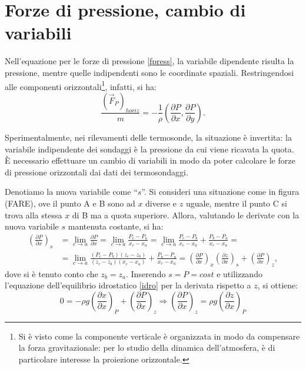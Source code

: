 \section{Forze di pressione, cambio di variabili}
Nell'equazione per le forze di pressione \eqref{fpress}, la variabile dipendente risulta la pressione, mentre quelle indipendenti sono le coordinate spaziali. Restringendosi alle componenti orizzontali\footnote{Si è visto come la componente verticale è organizzata in modo da compensare la forza gravitazionale: per lo studio della dinamica dell'atmosfera, è di particolare interesse la proiezione orizzontale.}, infatti, si ha:
\begin{equation}\label{forizz}
	\frac{(\vec{F}_P)_{horiz}}{m}=-\frac{1}{\rho}\left(\frac{\partial P}{\partial x},\frac{\partial P}{\partial y}\right).
\end{equation}

Sperimentalmente, nei rilevamenti delle termosonde, la situazione è invertita: la variabile indipendente dei sondaggi è la pressione da cui viene ricavata la quota. È necessario effettuare un cambio di variabili in modo da poter calcolare le forze di pressione orizzontali dai dati dei termosondaggi.

Denotiamo la nuova variabile come ``$s$''. Si consideri una situazione come in figura (FARE), ove il punto A e B sono ad $x$ diverse e $z$ uguale, mentre il punto C si trova alla stessa $x$ di B ma a quota superiore. Allora, valutando le derivate con la nuova variabile $s$ mantenuta costante, si ha:
\begin{align}
	\left(\frac{\partial P}{\partial x}\right)_s&=\lim_{c\to a}\frac{\partial P}{\partial x}=\lim_{c\to a}\frac{P_c-P_a}{x_c-x_a}=\lim_{c\to a}\frac{P_c-P_b}{x_c-x_a}+\frac{P_b-P_a}{x_c-x_a}=\\
		&=\lim_{c\to a}\frac{(P_c-P_b)(z_c-z_b)}{(z_c-z_b)(x_c-x_a)}+\frac{P_b-P_a}{x_c-x_a}=\left(\frac{\partial P}{\partial x}\right)_x \left(\frac{\partial z}{\partial x}\right)_s+\left(\frac{\partial P}{\partial x}\right)_z,
\end{align}
dove si è tenuto conto che $z_b=z_a$. Inserendo $s=P=cost$ e utilizzando l'equazione dell'equilibrio idrostatico \eqref{idro} per la derivata rispetto a $z$, si ottiene:
\begin{equation}
	0=-\rho g\left(\frac{\partial x}{\partial x}\right)_P+\left(\frac{\partial P}{\partial x}\right)_z \Rightarrow \left(\frac{\partial P}{\partial x}\right)_z=\rho g \left(\frac{\partial z}{\partial x}\right)_P
\end{equation}

